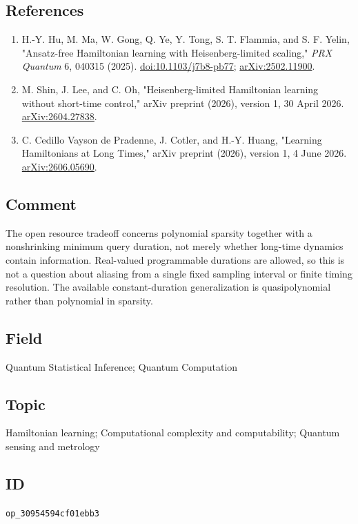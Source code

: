 \subsection*{References}

\begin{enumerate}[label={},leftmargin=4.8em,labelsep=0.5em]
  \footnotesize
  \item[\textup{[Hu25]}]\label{ref:3095-hu25}
  H.-Y. Hu, M. Ma, W. Gong, Q. Ye, Y. Tong, S. T. Flammia, and S. F. Yelin, "Ansatz-free Hamiltonian learning with Heisenberg-limited scaling," \emph{PRX Quantum} 6, 040315 (2025). \href{https://doi.org/10.1103/j7b8-pb77}{doi:10.1103/j7b8-pb77}; \href{https://arxiv.org/abs/2502.11900}{arXiv:2502.11900}.

  \item[\textup{[Shin26]}]\label{ref:3095-shin26}
  M. Shin, J. Lee, and C. Oh, "Heisenberg-limited Hamiltonian learning without short-time control," arXiv preprint (2026), version 1, 30 April 2026. \href{https://arxiv.org/abs/2604.27838}{arXiv:2604.27838}.

  \item[\textup{[Pradenne26]}]\label{ref:3095-pradenne26}
  C. Cedillo Vayson de Pradenne, J. Cotler, and H.-Y. Huang, "Learning Hamiltonians at Long Times," arXiv preprint (2026), version 1, 4 June 2026. \href{https://arxiv.org/abs/2606.05690}{arXiv:2606.05690}.
\end{enumerate}

\subsection*{Comment}

The open resource tradeoff concerns polynomial sparsity together with a nonshrinking minimum query duration, not merely whether long-time dynamics contain information. Real-valued programmable durations are allowed, so this is not a question about aliasing from a single fixed sampling interval or finite timing resolution. The available constant-duration generalization is quasipolynomial rather than polynomial in sparsity.

\subsection*{Field}

Quantum Statistical Inference; Quantum Computation

\subsection*{Topic}

Hamiltonian learning; Computational complexity and computability; Quantum sensing and metrology

\subsection*{ID}

\texttt{op\_30954594cf01ebb3}
